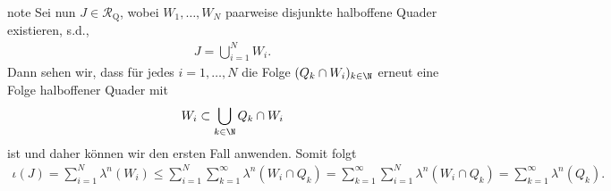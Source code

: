 \documentclass[letterpaper,10pt,german]{jupyterBook}
\begin{document}
\begin{sphinxadmonition}{note}
\sphinxAtStartPar
Sei nun \(J\in\mathcal{R}_{\text{Q}}\), wobei \(W_1,\ldots,W_N\) paarweise disjunkte halboffene Quader existieren, s.d.,
\begin{equation*}
\begin{split}J = \bigcup_{i=1}^N W_i.\end{split}
\end{equation*}
\sphinxAtStartPar
Dann sehen wir, dass für jedes \(i=1,\ldots,N\) die Folge \((Q_k\cap W_i)_{k\in\N}\) erneut eine Folge halboffener Quader mit
\begin{equation*}
\begin{split}W_i \subset \bigcup_{k\in\N} Q_k\cap W_i\end{split}
\end{equation*}
\sphinxAtStartPar
ist und daher können wir den ersten Fall anwenden. Somit folgt
\begin{equation*}
\begin{split}\iota(J) = \sum_{i=1}^N \lambda^n(W_i) \leq \sum_{i=1}^N \sum_{k=1}^\infty \lambda^n(W_i\cap Q_k) = 
\sum_{k=1}^\infty\sum_{i=1}^N \lambda^n(W_i\cap Q_k) = \sum_{k=1}^\infty \lambda^n(Q_k).\end{split}
\end{equation*}\end{sphinxadmonition}
\end{document}
